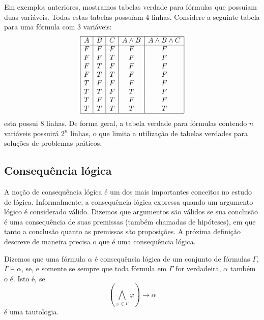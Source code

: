 Em exemplos anteriores, mostramos tabelas verdade para f\'ormulas que
possu\'iam duas vari\'aveis. Todas estas tabelas possu\'iam 4
linhas. Considere a seguinte tabela para uma f\'ormula com $3$
vari\'aveis:
\[
\begin{array}{|c|c|c|c|c|}
  \hline
  A & B & C & A \land B & A \land B \land C \\ \hline
  F  & F & F & F & F \\
  F & F & T & F & F \\
  F & T & F & F & F \\
  F  & T & T & F & F \\
  T & F  & F & F & F \\
  T & T & F & T & F \\
  T & F & T & F & F \\
  T & T & T & T & T\\ \hline
\end{array}
\]
esta possui 8 linhas. De forma geral, a tabela verdade para f\'ormulas
contendo $n$ vari\'aveis possuir\'a $2^n$ linhas, o que limita a
utilização de tabelas verdades  para soluç\~oes de problemas
pr\'aticos.

\subsection{Consequ\^encia l\'ogica}\label{consequencia-logica}

A no\c{c}\~ao de consequ\^encia l\'ogica \'e um dos mais importantes
conceitos no estudo de l\'ogica. Informalmente, a consequ\^encia
l\'ogica expressa quando um argumento l\'ogico \'e considerado
v\'alido. Dizemos que argumentos s\~ao v\'alidos se sua conclus\~ao
\'e uma consequ\^encia de suas premissas (tamb\'em chamadas de hip\'oteses), em que tanto a conclus\~ao
quanto as premissas s\~ao proposi\c{c}\~oes. A pr\'oxima
defini\c{c}\~ao descreve de maneira precisa o que \'e uma
consequ\^encia l\'ogica.

\begin{Definition}
Dizemos que uma f\'ormula $\alpha$ \'e consequ\^encia l\'ogica de um
conjunto de f\'ormulas $\Gamma$, $\Gamma \models \alpha$, se, e
somente se sempre que toda f\'ormula em $\Gamma$ for verdadeira,
$\alpha$ tamb\'em o \'e. Isto \'e, se
\[
     \left(\bigwedge_{\varphi\in\Gamma}\varphi\right)\to \alpha
\]
\'e uma tautologia.
\end{Definition}


